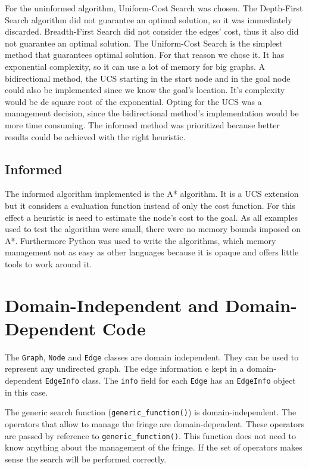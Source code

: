 \documentclass[a4paper]{article}
\begin{document}
	For the uninformed algorithm, Uniform-Cost Search was chosen. The Depth-First Search algorithm did not guarantee an optimal solution, so it was immediately discarded. Breadth-First Search did not consider the edges' cost, thus it also did not guarantee an optimal solution.
	The Uniform-Cost Search is the simplest method that guarantees optimal solution. For that reason we chose it. It has exponential complexity, so it can use a lot of memory for big graphs. A bidirectional method, the UCS starting in the start node and in the goal node could also be implemented since we know the goal's location. It's complexity would be de square root of the exponential.
    Opting for the UCS was a management decision, since the bidirectional method's implementation would be more time consuming. The informed method was prioritized because better results could be achieved with the right heuristic.
    
    
    \subsection{Informed}
    
    The informed algorithm implemented is the A* algorithm. It is a UCS extension but it considers a evaluation function instead of only the cost function. For this effect a heuristic is need to estimate the node's cost to the goal.
	As all examples used to test the algorithm were small, there were no memory bounds imposed on A*. Furthermore Python was used to write the algorithms, which memory management not as easy as other languages because it is opaque and offers little tools to work around it.
    
    \section{Domain-Independent and Domain-Dependent Code}
    
    The \texttt{Graph}, \texttt{Node} and \texttt{Edge} classes are domain independent. They can be used to represent any undirected graph. The edge information e kept in a domain-dependent \texttt{EdgeInfo} class. The \texttt{info} field for each \texttt{Edge} has an \texttt{EdgeInfo} object in this case.
    
    The generic search function (\texttt{generic\_function()}) is domain-independent. The operators that allow to manage the fringe are domain-dependent. These operators are passed by reference to \texttt{generic\_function()}. This function does not need to know anything about the management of the fringe. If the set of operators makes sense the search will be performed correctly.
    
\end{document}

